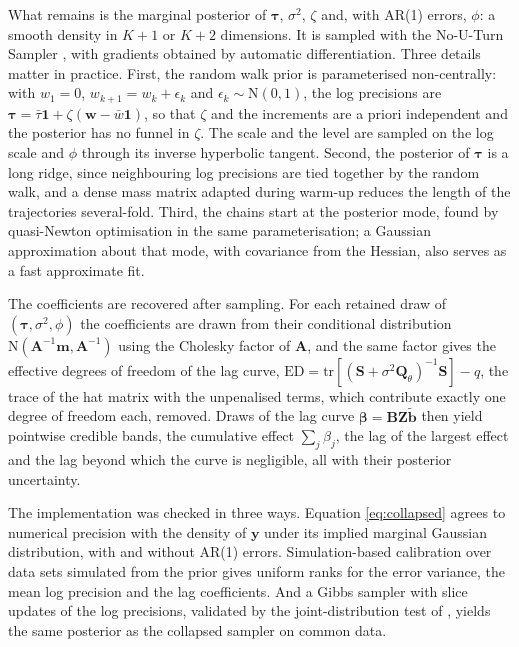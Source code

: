 \documentclass[11pt]{article}
\newcommand{\by}{\mathbf{y}}
\newcommand{\bb}{\mathbf{b}}
\newcommand{\bQ}{\mathbf{Q}}
\newcommand{\bS}{\mathbf{S}}
\newcommand{\bA}{\mathbf{A}}
\newcommand{\bZ}{\mathbf{Z}}
\newcommand{\bone}{\mathbf{1}}
\newcommand{\btau}{\bm{\tau}}
\newcommand{\bbeta}{\bm{\beta}}
\newcommand{\N}{\mathrm{N}}
\newcommand{\tr}{\mathrm{tr}}
\begin{document}
What remains is the marginal posterior of $\btau$, $\sigma^2$, $\zeta$ and,
with AR(1) errors, $\phi$: a smooth density in $K + 1$ or $K + 2$ dimensions.
It is sampled with the No-U-Turn Sampler \citep{hoffman2014}, with gradients
obtained by automatic differentiation. Three details matter in practice.
First, the random walk prior is parameterised non-centrally: with $w_1 = 0$,
$w_{k+1} = w_k + \epsilon_k$ and $\epsilon_k \sim \N(0, 1)$, the log
precisions are $\btau = \bar{\tau} \bone + \zeta (\mathbf{w} - \bar{w}
\bone)$, so that $\zeta$ and the increments are a priori independent and the
posterior has no funnel in $\zeta$. The scale and the level are sampled on
the log scale and $\phi$ through its inverse hyperbolic tangent. Second, the
posterior of $\btau$ is a long ridge, since neighbouring log precisions are
tied together by the random walk, and a dense mass matrix adapted during
warm-up reduces the length of the trajectories several-fold. Third, the
chains start at the posterior mode, found by quasi-Newton optimisation in the
same parameterisation; a Gaussian approximation about that mode, with
covariance from the Hessian, also serves as a fast approximate fit.

The coefficients are recovered after sampling. For each retained draw of
$(\btau, \sigma^2, \phi)$ the coefficients are drawn from their conditional
distribution $\N(\bA^{-1} \mathbf{m}, \bA^{-1})$ using the Cholesky factor
of $\bA$, and the same factor gives the effective degrees of freedom of the
lag curve, $\mbox{ED} = \tr[(\bS + \sigma^2 \bQ_\theta)^{-1} \bS] - q$, the
trace of the hat matrix with the unpenalised terms, which contribute exactly
one degree of freedom each, removed. Draws of the lag curve $\bbeta =
\mathbf{B} \bZ \tilde{\bb}$ then yield pointwise credible bands, the
cumulative effect $\sum_j \beta_j$, the lag of the largest effect and the
lag beyond which the curve is negligible, all with their posterior
uncertainty.

The implementation was checked in three ways. Equation \eqref{eq:collapsed}
agrees to numerical precision with the density of $\by$ under its implied
marginal Gaussian distribution, with and without AR(1) errors. Simulation-based
calibration \citep{talts2018} over data sets simulated from the prior gives
uniform ranks for the error variance, the mean log precision and the lag
coefficients. And a Gibbs sampler with slice updates of the log precisions,
validated by the joint-distribution test of \citet{geweke2004}, yields the
same posterior as the collapsed sampler on common data.
\end{document}
